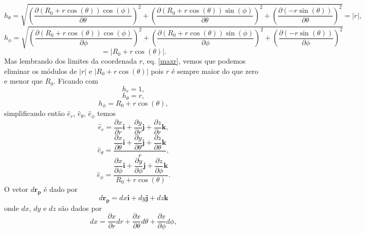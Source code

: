 \documentclass[12pt,oneside,a4paper]{abntex2}
\begin{document}
\begin{equation}
h_\theta = \sqrt{ \left(\dfrac{\partial (R_0+r \cos(\theta)) \cos(\phi)}{\partial \theta} \right)^2 + \left(\dfrac{\partial (R_0+r \cos(\theta)) \sin(\phi)}{\partial \theta}\right)^2 + \left(\dfrac{\partial (- r \sin(\theta))}{\partial \theta}\right)^2 } =  |r|,
\end{equation}
\begin{equation}
h_\phi = \sqrt{ \left(\dfrac{\partial (R_0+r \cos(\theta)) \cos(\phi)}{\partial \phi} \right)^2 + \left(\dfrac{\partial (R_0+r \cos(\theta)) \sin(\phi)}{\partial \phi}\right)^2 + \left(\dfrac{\partial (- r \sin(\theta))}{\partial \phi}\right)^2 }
\end{equation}
\begin{equation*}
=|R_0 + r \cos(\theta)|.
\end{equation*}
Mas lembrando dos limites da coordenada $r$, eq. \ref{maxr}, vemos que podemos eliminar os módulos de $|r|$ e $|R_0 + r \cos(\theta)|$ pois $r$ é sempre maior do que zero e menor que $R_0$. Ficando com
\begin{equation}
h_r = 1,
\end{equation}
\begin{equation}
h_\theta =  r,
\end{equation}
\begin{equation}
h_\phi = R_0 + r \cos(\theta),
\end{equation}
simplificando então $\hat{e}_r$, $\hat{e}_\theta$, $\hat{e}_\phi$ temos
\begin{equation}
\hat{e}_r = \dfrac{\partial x}{\partial r}\bm{i} + \dfrac{\partial y}{\partial r}\bm{j} + \dfrac{\partial z}{\partial r}\bm{k},
\end{equation}
\begin{equation}
\hat{e}_\theta = \frac{ \dfrac{\partial x}{\partial \theta}\bm{i} + \dfrac{\partial y}{\partial \theta}\bm{j} + \dfrac{\partial z}{\partial \theta}\bm{k} }{r},
\end{equation}
\begin{equation}
\hat{e}_\phi = \frac{\dfrac{\partial x}{\partial \phi}\bm{i} + \dfrac{\partial y}{\partial \phi}\bm{j} + \dfrac{\partial z}{\partial \phi}\bm{k}}{ R_0 + r \cos(\theta)}.
\end{equation}
O vetor $d\bm{r_p}$ é dado por 
\begin{equation}
d\bm{r_p} = dx\bm{i} + dy\bm{j} + dz\bm{k}
\end{equation}
onde $dx$, $dy$ e $dz$ são dados por
\begin{equation}
dx = \dfrac{\partial x}{\partial r} dr + \dfrac{\partial x}{\partial \theta} d\theta + \dfrac{\partial x}{\partial \phi} d\phi,
\end{equation}
\end{document}
